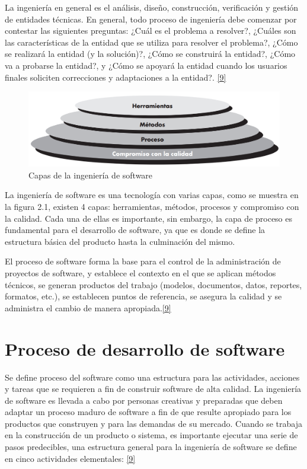 La ingeniería en general es el análisis, diseño, construcción, verificación y gestión de entidades técnicas. En general, todo proceso de ingeniería debe comenzar por contestar las siguientes preguntas: ¿Cuál es el problema a
resolver?, ¿Cuáles son las características de la entidad que se utiliza para resolver el problema?, ¿Cómo se realizará la entidad (y la solución)?, ¿Cómo se construirá la entidad?, ¿Cómo va a probarse la entidad?, y ¿Cómo se apoyará la entidad cuando los
usuarios finales soliciten correcciones y adaptaciones a la entidad?.  \hyperlink{b09}{[9]}  \\

\begin{figure}[H]
	\begin{center}
		\includegraphics[width=.95\textwidth]{images/CapasIS}
		\caption{Capas de la ingeniería de software}
		\label{fig:capas_is}
	\end{center}
\end{figure}

La ingeniería de software es una tecnología con varias capas, como se muestra en la figura 2.1, existen 4 capas: herramientas, métodos, procesos y compromiso con la calidad. Cada una de ellas es importante, sin embargo, la capa de proceso es fundamental para el desarrollo de software, ya que es donde se define la estructura básica del producto hasta la culminación del mismo.

El proceso de software forma la base para el control de la administración de proyectos de software, y establece el contexto en el que se aplican métodos técnicos, se generan productos del trabajo (modelos, documentos, datos, reportes, formatos, etc.), se establecen puntos de referencia, se asegura la calidad y se administra el cambio de manera apropiada.\hyperlink{b09}{[9]} 

\section{Proceso de desarrollo de software}

Se define proceso del software como una estructura para las actividades, acciones y tareas que se requieren a fin de construir software de alta calidad. La ingeniería de software es llevada a cabo por personas creativas y preparadas que deben adaptar un proceso maduro de software a fin de que resulte apropiado para los productos que construyen y para las demandas de su mercado.
Cuando se trabaja en la construcción de un producto o sistema, es importante ejecutar una serie de pasos predecibles, una estructura general para la ingeniería de software se define en cinco actividades elementales: \hyperlink{b09}{[9]} 

